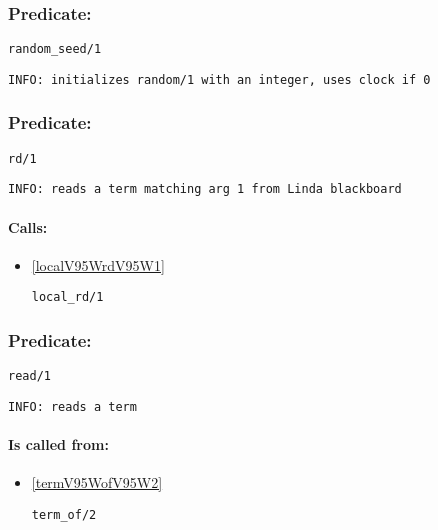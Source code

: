 \subsubsection{Predicate:} \label{randomV95WseedV95W1}

\begin{verbatim}
random_seed/1
\end{verbatim}

{\small \begin{verbatim}
INFO: initializes random/1 with an integer, uses clock if 0

\end{verbatim}}

\subsubsection{Predicate:} \label{rdV95W1}

\begin{verbatim}
rd/1
\end{verbatim}

{\small \begin{verbatim}
INFO: reads a term matching arg 1 from Linda blackboard

\end{verbatim}}
\paragraph{Calls:} 
\begin{itemize}
\item \ref{localV95WrdV95W1} 
\begin{verbatim}
local_rd/1
\end{verbatim}

\end{itemize}

\subsubsection{Predicate:} \label{readV95W1}

\begin{verbatim}
read/1
\end{verbatim}

{\small \begin{verbatim}
INFO: reads a term

\end{verbatim}}
\paragraph{Is called from:} 
\begin{itemize}
\item \ref{termV95WofV95W2} 
\begin{verbatim}
term_of/2
\end{verbatim}

\end{itemize}


